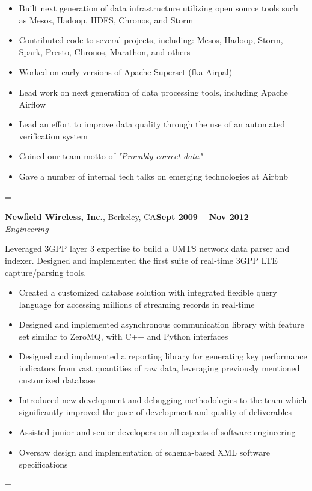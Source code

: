 \documentclass[margin,line]{resume}
\newenvironment{absolutelynopagebreak}
  {\par\nobreak\vfil\penalty0\vfilneg
   \vtop\bgroup}
  {\par\xdef\tpd{\the\prevdepth}\egroup
   \prevdepth=\tpd}
\begin{document}
\begin{resume}
\begin{absolutelynopagebreak}
    \begin{itemize}
        \item Built next generation of data infrastructure utilizing open source
        tools such as Mesos, Hadoop, HDFS, Chronos, and Storm
        \item Contributed code to several projects, including: Mesos, Hadoop,
        Storm, Spark, Presto, Chronos, Marathon, and others
        \item Worked on early versions of Apache Superset (fka Airpal)
        \item Lead work on next generation of data processing tools, including
        Apache Airflow
        \item Lead an effort to improve data quality through the use of an
        automated verification system
        \item Coined our team motto of \emph{"Provably correct data"}
        \item Gave a number of internal tech talks on emerging technologies at
        Airbnb
    \end{itemize}
    \end{absolutelynopagebreak}

    \vspace{5mm}

    \begin{absolutelynopagebreak}
    \textbf{Newfield Wireless, Inc.}, Berkeley, CA\hfill \textbf{Sept 2009 -- Nov 2012}\vspace{2mm}\\\vspace{1mm}%
    \textsl{Engineering}

    Leveraged 3GPP layer 3 expertise to build a UMTS network data parser and
    indexer. Designed and implemented the first suite of real-time 3GPP LTE
    capture/parsing tools.

    \begin{itemize}
        \item Created a customized database solution with integrated flexible
        query language for accessing millions of streaming records in real-time
        \item Designed and implemented asynchronous communication library with
        feature set similar to ZeroMQ, with C++ and Python interfaces
        \item Designed and implemented a reporting library for generating key
        performance indicators from vast quantities of raw data, leveraging
        previously mentioned customized database
        \item Introduced new development and debugging methodologies to the team
        which significantly improved the pace of development and quality of
        deliverables
        \item Assisted junior and senior developers on all aspects of software
        engineering
        \item Oversaw design and implementation of schema-based XML software
        specifications
    \end{itemize}
    \end{absolutelynopagebreak}
    

\end{resume}
\end{document}
